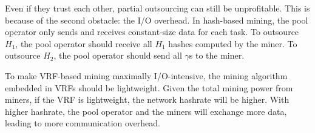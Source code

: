 Even if they trust each other, partial outsourcing can still be unprofitable.
This is because of the second obstacle: the I/O overhead.
In hash-based mining, the pool operator only sends and receives constant-size data for each task.
To outsource $H_1$, the pool operator should receive all $H_1$ hashes computed by the miner.
To outsource $H_2$, the pool operator should send all $\gamma$s to the miner.

To make VRF-based mining maximally I/O-intensive, the mining algorithm embedded in VRFs should be lightweight.
Given the total mining power from miners, if the VRF is lightweight, the network hashrate will be higher.
With higher hashrate, the pool operator and the miners will exchange more data, leading to more communication overhead.